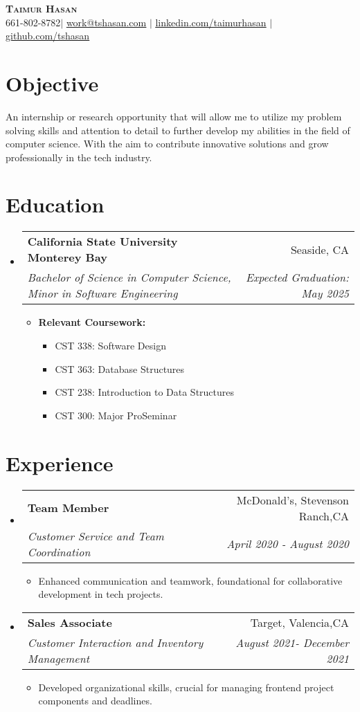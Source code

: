 \documentclass[letterpaper,11pt]{article}
\makeatletter
\newcommand{\resumeItem}[1]{
  \item\small{
    {#1 \vspace{-2pt}}
  }
}
\newcommand{\resumeSubheading}[4]{
  \vspace{-2pt}\item
    \begin{tabular*}{0.97\textwidth}[t]{l@{\extracolsep{\fill}}r}
      \textbf{#1} & #2 \\
      \textit{\small#3} & \textit{\small #4} \\
    \end{tabular*}\vspace{-7pt}
}
\newcommand{\resumeSubHeadingListStart}{\begin{itemize}[leftmargin=0.15in, label={}]}
\newcommand{\resumeSubHeadingListEnd}{\end{itemize}}
\newcommand{\resumeItemListStart}{\begin{itemize}}
\newcommand{\resumeItemListEnd}{\end{itemize}\vspace{-5pt}}
\makeatother
\begin{document}
\begin{center}
    \textbf{\Huge \scshape Taimur Hasan} \\ \vspace{1pt}
    \small 661-802-8782$|$ \href{mailto:work@tshasan.com}{\underline{work@tshasan.com}} $|$ 
    \href{https://www.linkedin.com/in/taimurhasan1/}{\underline{linkedin.com/taimurhasan}} $|$
    \href{https://github.com/tshasan}{\underline{github.com/tshasan}}
\end{center}

\section{Objective}
An internship or research opportunity that will allow me to utilize my problem solving skills and attention to detail to further develop my abilities in the field of computer science. With the aim to contribute innovative solutions and grow professionally in the tech industry.


\section{Education}
  \resumeSubHeadingListStart
    \resumeSubheading
      {California State University Monterey Bay}{Seaside, CA}
      {Bachelor of Science in Computer Science, Minor in Software Engineering}{Expected Graduation: May 2025}
      \resumeItemListStart
        \item{\textbf{Relevant Coursework:}}
        \begin{itemize}
          \item CST 338: Software Design
          \item CST 363: Database Structures
          \item CST 238: Introduction to Data Structures
          \item CST 300: Major ProSeminar
        \end{itemize}
      \resumeItemListEnd
  \resumeSubHeadingListEnd

\section{Experience}
  \resumeSubHeadingListStart
    \resumeSubheading
      {Team Member}{McDonald's, Stevenson Ranch,CA}
      {Customer Service and Team Coordination}{April 2020 - August 2020}
      \resumeItemListStart
        \resumeItem{Enhanced communication and teamwork, foundational for collaborative development in tech projects.}
      \resumeItemListEnd
    \resumeSubheading
      {Sales Associate}{Target, Valencia,CA}
      {Customer Interaction and Inventory Management}{August 2021- December 2021}
      \resumeItemListStart
        \resumeItem{Developed organizational skills, crucial for managing frontend project components and deadlines.}
      \resumeItemListEnd
  \resumeSubHeadingListEnd
\end{document}
